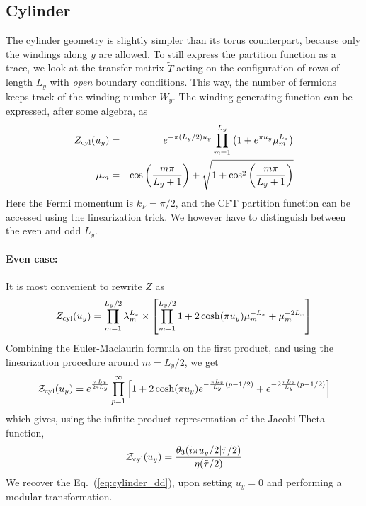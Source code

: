 \documentclass[11pt]{iopart}
\begin{document}
\subsection[\;\;\;\;\;\;\;\;\;\;\;\;\;\; Cylinder]{Cylinder}
The cylinder geometry is slightly simpler than its torus counterpart, because only the windings along $y$ are allowed. To still express the partition function as a trace, we look at the transfer matrix $\tilde{T}$ acting on the configuration of rows of length $L_y$ with \emph{open} boundary conditions. This way, the number of fermions keeps track of the winding number $W_y$. The winding generating function can be expressed, after some algebra, as
\begin{eqnarray}
 Z_{\rm cyl}(u_y)&=&e^{-\pi (L_y/2)u_y}\prod_{m=1}^{L_y} \left(1+e^{\pi u_y}\mu_m^{L_x}\right)\\
 \mu_m&=&\cos \left(\frac{m \pi}{L_y+1}\right)+\sqrt{1+\cos^2\left(\frac{m \pi}{L_y+1}\right)}
\end{eqnarray}
Here the Fermi momentum is $k_F=\pi/2$, and the CFT partition function can be accessed using the linearization trick. We however have to distinguish between the even and odd $L_y$.
\paragraph{Even case:}
It is most convenient to rewrite $Z$ as
\begin{equation}
Z_{\rm cyl}(u_y)=\prod_{m=1}^{L_y/2} \lambda_m^{L_x}\times \left[\prod_{m=1}^{L_y/2} 1+2\cosh (\pi u_y)\mu_m^{-L_x}+\mu_m^{-2L_x}\right] 
\end{equation}
Combining the Euler-Maclaurin formula on the first product, and using the linearization procedure around $m=L_y/2$, we get
\begin{equation}
 \mathcal{Z}_{\rm cyl}(u_y)= e^{\frac{\pi L_x}{24 L_y}}\prod_{p=1}^{\infty}\left[1+2 \cosh (\pi u_y)e^{-\frac{\pi L_x}{L_y}(p-1/2)}+e^{-2\frac{\pi L_x}{L_y}(p-1/2)}\right]
\end{equation}
which gives, using the infinite product representation of the Jacobi Theta function,
\begin{equation}
 \mathcal{Z}_{\rm cyl}(u_y)=\frac{\theta_3(i \pi u_y/2|\tilde{\tau}/2)}{\eta(\tilde{\tau}/2)}
\end{equation}
We recover the Eq.~(\ref{eq:cylinder_dd}), upon setting $u_y=0$ and performing a modular transformation. 
\end{document}
